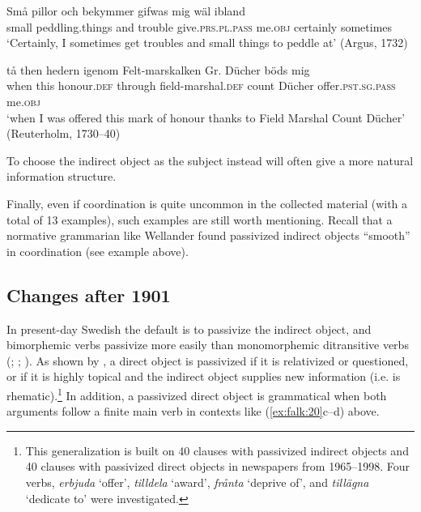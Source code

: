 \documentclass[output=paper]{langscibook}
\begin{document}
\ea%
    \label{ex:falk:26}

\ea
\gll Små  pillor          och  bekymmer  gifwas        mig    wäl ibland\\
      small  peddling.things  and  trouble     give.\textsc{prs.pl.pass}  me.\textsc{obj}  certainly              sometimes\\
\glt ‘Certainly, I sometimes get troubles and small things to peddle at’ (Argus, 1732)

\ex
\gll tå    then  hedern    igenom  Felt-marskalken    Gr.      Dücher böds            mig\\
when  this  honour.\textsc{def}  through  field-marshal.\textsc{def}    count    Dücher      offer.\textsc{pst.sg.pass}    me\textsc{.obj}\\
\glt ‘when I was offered this mark of honour thanks to Field Marshal Count Dücher’ (Reuterholm, 1730–40)
\z
\z


To choose the indirect object as the subject instead will often give a more natural information structure.


Finally, even if coordination is quite uncommon in the collected material (with a total of 13 examples), such examples are still worth mentioning. Recall that a normative grammarian like Wellander found passivized indirect objects “smooth” in coordination (see example  above).


\subsection{Changes after 1901}\label{sec:falk:5.3}


In present-day Swedish the default is to passivize the indirect object, and bimorphemic verbs passivize more easily than monomorphemic ditransitive verbs (\citealt{HolmbergPlatzack1995}; \citealt{Lundquist2004}; \citealt{HaddicanHolmberg2019}). As shown by \citet{Lundquist2004}, a direct object is passivized if it is relativized or questioned, or if it is highly topical and the indirect object supplies new information (i.e. is rhematic).\footnote{This generalization is built on 40 clauses with passivized indirect objects and 40 clauses with passivized direct objects in newspapers from 1965–1998. Four verbs, \textit{erbjuda} ‘offer’, \textit{tilldela} ‘award’, \textit{frånta} ‘deprive of’, and \textit{tillägna} ‘dedicate to’ were investigated.} In addition, a passivized direct object is grammatical when both arguments follow a finite main verb in contexts like (\ref{ex:falk:20}c–d) above. 
\end{document}
